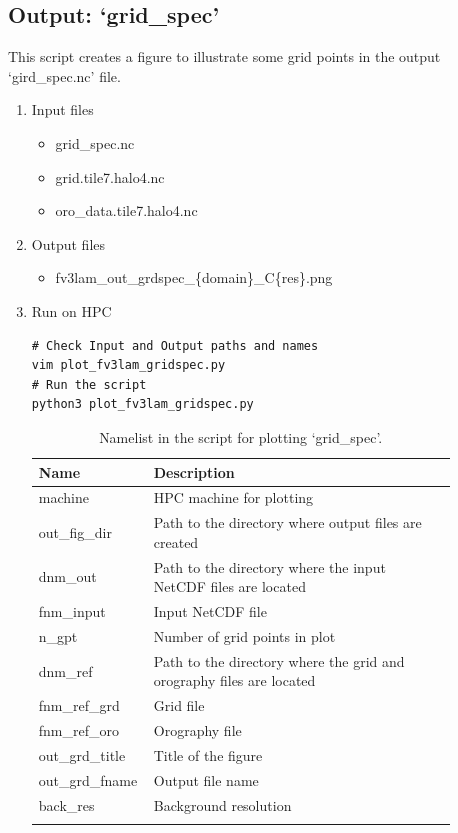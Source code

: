 \documentclass[11pt,fleqn]{report}              %
\begin{document}
\subsection{Output: `grid\_spec'}

This script creates a figure to illustrate some grid points in the output `gird\_spec.nc' file.

\begin{enumerate}
\item Input files
\begin{itemize}
\item grid\_spec.nc
\item grid.tile7.halo4.nc
\item oro\_data.tile7.halo4.nc
\end{itemize}
\item Output files
\begin{itemize}
\item fv3lam\_out\_grdspec\_\{domain\}\_C\{res\}.png
\end{itemize}
\item Run on HPC

\lstset{language=bash}   
\begin{lstlisting}[frame=trBL]
# Check Input and Output paths and names
vim plot_fv3lam_gridspec.py
# Run the script
python3 plot_fv3lam_gridspec.py
\end{lstlisting}

{
\fontsize{10}{12}\selectfont
\begin{longtable}{p{0.17\linewidth} | p{0.7\linewidth} }
\hline
\hline
Name & Description \\
\hline
 machine & HPC machine for plotting \\
 out\_fig\_dir & Path to the directory where output files are created \\ 
 dnm\_out & Path to the directory where the input NetCDF files are located   \\
 fnm\_input & Input NetCDF file \\
 n\_gpt & Number of grid points in plot \\
 dnm\_ref & Path to the directory where the grid and orography files are located \\
 fnm\_ref\_grd & Grid file \\
 fnm\_ref\_oro & Orography file \\
 out\_grd\_title\ & Title of the figure \\
 out\_grd\_fname & Output file name \\
 back\_res & Background resolution \\
\hline
\caption{Namelist in the script for plotting `grid\_spec'.}
\label{table:fv3_var_gridspec}
\end{longtable}
}



\end{enumerate}
\end{document}
